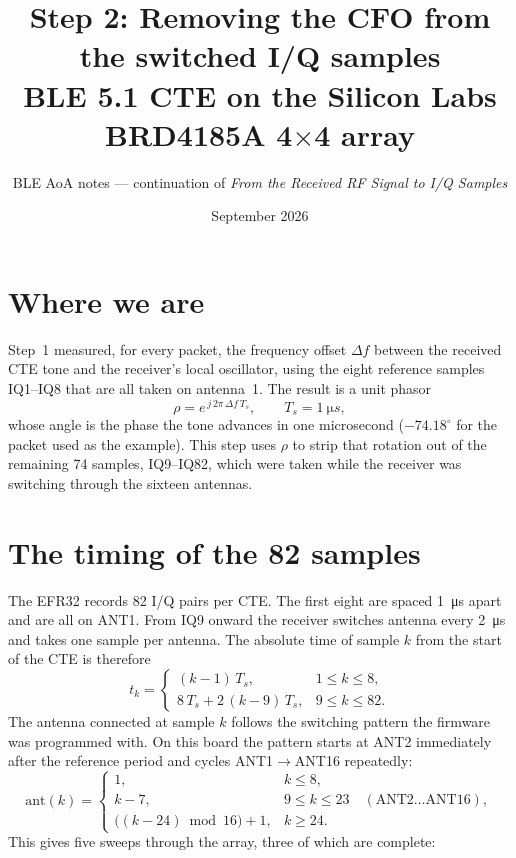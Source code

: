 \documentclass[11pt,a4paper]{article}
\title{Step 2: Removing the CFO from the switched I/Q samples\\[4pt]\large BLE 5.1 CTE on the Silicon Labs BRD4185A 4$\times$4 array}
\author{BLE AoA notes --- continuation of \emph{From the Received RF Signal to I/Q Samples}}
\date{September 2026}
\begin{document}
\maketitle

\section{Where we are}
Step~1 measured, for every packet, the frequency offset $\Delta f$ between the received CTE tone and the receiver's local oscillator, using the eight reference samples IQ1--IQ8 that are all taken on antenna~1. The result is a unit phasor
\[
  \rho = e^{\,j\,2\pi\,\Delta f\,T_s},\qquad T_s = \SI{1}{\micro s},
\]
whose angle is the phase the tone advances in one microsecond ($-74.18^\circ$ for the packet used as the example). This step uses $\rho$ to strip that rotation out of the remaining 74 samples, IQ9--IQ82, which were taken while the receiver was switching through the sixteen antennas.

\section{The timing of the 82 samples}
The EFR32 records 82 I/Q pairs per CTE. The first eight are spaced \SI{1}{\micro s} apart and are all on ANT1. From IQ9 onward the receiver switches antenna every \SI{2}{\micro s} and takes one sample per antenna. The absolute time of sample $k$ from the start of the CTE is therefore
\[
  t_k =
  \begin{cases}
    (k-1)\,T_s, & 1\le k\le 8, \\[2pt]
    8\,T_s + 2\,(k-9)\,T_s, & 9\le k\le 82.
  \end{cases}
\]
The antenna connected at sample $k$ follows the switching pattern the firmware was programmed with. On this board the pattern starts at ANT2 immediately after the reference period and cycles ANT1$\to$ANT16 repeatedly:
\[
  \mathrm{ant}(k) =
  \begin{cases}
    1, & k\le 8,\\
    k-7, & 9\le k\le 23 \quad(\text{ANT2}\dots\text{ANT16}),\\
    \big((k-24)\bmod 16\big)+1, & k\ge 24.
  \end{cases}
\]
This gives five sweeps through the array, three of which are complete:
\end{document}
